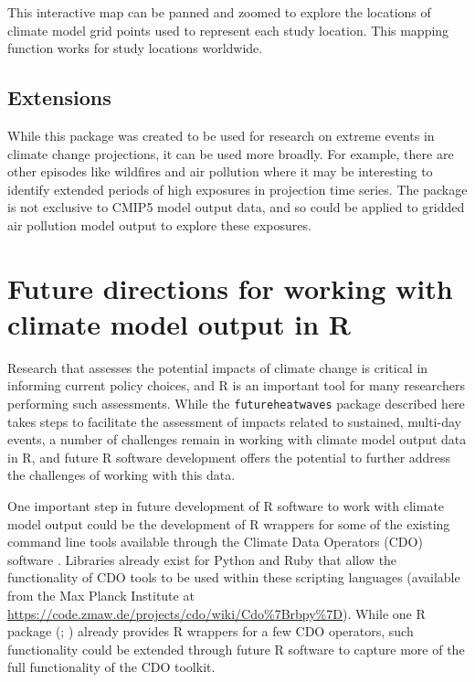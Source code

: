 \noindent This interactive map can be panned and zoomed to explore the
locations of climate model grid points used to represent each study
location. This mapping function works for study locations worldwide.

\subsection{Extensions}\label{extensions}

While this package was created to be used for research on extreme events
in climate change projections, it can be used more broadly. For example,
there are other episodes like wildfires and air pollution where it may
be interesting to identify extended periods of high exposures in
projection time series. The  package is not
exclusive to CMIP5 model output data, and so could be applied to gridded
air pollution model output to explore these exposures.

\section{Future directions for working with climate model output in
R}\label{future-directions-for-working-with-climate-model-output-in-r}

Research that assesses the potential impacts of climate change is
critical in informing current policy choices, and R is an important tool
for many researchers performing such assessments. While the
\texttt{futureheatwaves} package described here takes steps to
facilitate the assessment of impacts related to sustained, multi-day
events, a number of challenges remain in working with climate model
output data in R, and future R software development offers the potential
to further address the challenges of working with this data.

One important step in future development of R software to work with
climate model output could be the development of R wrappers for some of
the existing command line tools available through the Climate Data
Operators (CDO) software \citep{schulzweida2006cdo}. Libraries already
exist for Python and Ruby that allow the functionality of CDO tools to
be used within these scripting languages (available from the Max Planck
Institute at
\url{https://code.zmaw.de/projects/cdo/wiki/Cdo%7Brbpy%7D}). While one R
package (; \citet{ncdf4helpers}) already provides
R wrappers for a few CDO operators, such functionality could be extended
through future R software to capture more of the full functionality of
the CDO toolkit.

